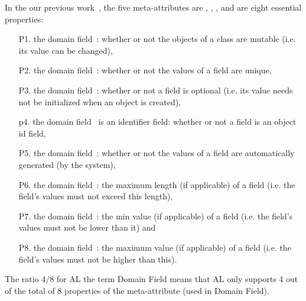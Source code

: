 	In the our previous work~\cite{le_domain_2018}, the five meta-attributes are , , ,  and  are eight  essential properties: 
	\begin{enumerate}
		\item[P1.] the domain field~: whether or not the objects of a class are mutable  (i.e. its value can be changed),
		\item[P2.] the domain field~: whether or not the values of a field are unique,
		\item[P3.] the domain field~: whether or not a field is optional (i.e. its value needs not be initialized when an object is created),
		\item[p4.] the domain field~ is an identifier field: whether or not a field is an object id field,
		\item[P5.] the domain field~: whether or not the values of a field are automatically generated (by the system),
		\item[P6.] the domain field~: the maximum length (if applicable) of a field (i.e. the field’s values must not exceed this length),
		\item[P7.] the domain field~:  the min value (if applicable) of a field (i.e. the field’s values must not be lower than it) and
		\item[P8.] the domain field~:  the maximum value (if applicable) of a field (i.e. the field’s values must not be higher than this).
				
	\end{enumerate}
	The ratio 4/8 for AL \wrt the term Domain Field means that AL only supports 4 out of the total of 8 properties of the meta-attribute  (used in Domain Field). 
	
